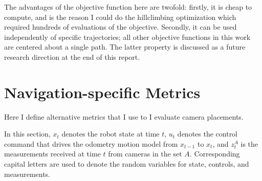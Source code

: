 \documentclass[a4paper,12pt,twoside,openright]{report}
\begin{document}
The advantages of the objective function here are twofold:
firstly, it is cheap to compute, and is the reason I could
do the hillclimbing optimization which
required hundreds of evaluations of the objective. Secondly,
it can be used independently of specific trajectories; all
other objective functions in this work are centered about
a single path. The latter property is discussed 
as a future research direction at the end of this report.



\section{Navigation-specific Metrics}

Here I define alternative metrics that I use to
I evaluate camera placements. 

In this section, $x_t$ denotes the robot
state at time $t$, $u_t$ denotes the control command
that drives the odometry motion model from $x_{t-1}$ to
$x_{t}$, and $z^{A}_{t}$ is the measurements received
at time $t$ from cameras in the set $A$. Corresponding
capital letters are used to denote the random variables
for state, controls, and  measurements.





\end{document}
